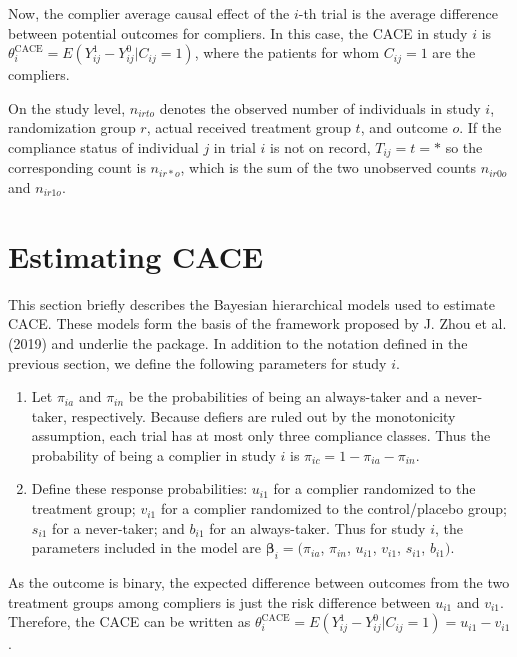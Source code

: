 Now, the complier average causal effect of the \(i\)-th trial is the average difference between potential outcomes for compliers. In this case, the CACE in study \(i\) is \(\theta^\text{CACE}_i=E(Y^1_{ij}-Y^0_{ij}|C_{ij}=1)\), where the patients for whom \(C_{ij}=1\) are the compliers.

On the study level, \(n_{irto}\) denotes the observed number of individuals in study \(i\), randomization group \(r\), actual received treatment group \(t\), and outcome \(o\). If the compliance status of individual \(j\) in trial \(i\) is not on record, \(T_{ij}=t=*\) so the corresponding count is \(n_{ir*o}\), which is the sum of the two unobserved counts \(n_{ir0o}\) and \(n_{ir1o}\).

\hypertarget{estimating-cace}{%
\section{Estimating CACE}\label{estimating-cace}}

This section briefly describes the Bayesian hierarchical models used to estimate CACE. These models form the basis of the framework proposed by J. Zhou et al. (2019) and underlie the  package. In addition to the notation defined in the previous section, we define the following parameters for study \(i\).

\begin{enumerate}
\def\labelenumi{\arabic{enumi}.}
\tightlist
\item
  Let \(\pi_{ia}\) and \(\pi_{in}\) be the probabilities of being an always-taker and a never-taker, respectively. Because defiers are ruled out by the monotonicity assumption, each trial has at most only three compliance classes. Thus the probability of being a complier in study \(i\) is \(\pi_{ic}=1-\pi_{ia}-\pi_{in}\).
\item
  Define these response probabilities: \(u_{i1}\) for a complier randomized to the treatment group; \(v_{i1}\) for a complier randomized to the control/placebo group; \(s_{i1}\) for a never-taker; and \(b_{i1}\) for an always-taker. Thus for study \(i\), the parameters included in the model are \(\boldsymbol{\beta}_i=(\pi_{ia}\), \(\pi_{in}\), \(u_{i1}\), \(v_{i1}\), \(s_{i1}\), \(b_{i1})\).
\end{enumerate}

As the outcome is binary, the expected difference between outcomes from the two treatment groups among compliers is just the risk difference between \(u_{i1}\) and \(v_{i1}\). Therefore, the CACE can be written as \(\theta^\text{CACE}_i=E(Y^1_{ij}-Y^0_{ij}|C_{ij}=1)=u_{i1}-v_{i1}\).

